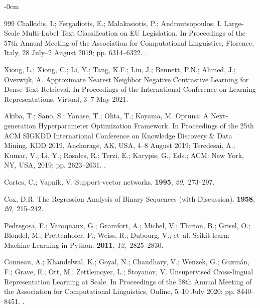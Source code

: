 \documentclass[make,article,accept,pdftex,moreauthors]{Definitions/mdpi}
\begin{document}
\begin{adjustwidth}{-\extralength}{0cm}
\begin{thebibliography}{999}
Chalkidis, I.; Fergadiotis, E.; Malakasiotis, P.; Androutsopoulos, I.
\newblock Large-Scale Multi-Label Text Classification on {EU} Legislation.
\newblock In Proceedings of the 57th Annual Meeting of the
  Association for Computational Linguistics, Florence, Italy, 28 July--2 August 2019; pp.
  6314--6322.
.

Xiong, L.; Xiong, C.; Li, Y.; Tang, K.F.; Liu, J.; Bennett, P.N.; Ahmed, J.;
  Overwijk, A.
\newblock Approximate Nearest Neighbor Negative Contrastive Learning for Dense
  Text Retrieval.
\newblock In Proceedings of the International Conference on Learning
  Representations, Virtual, 3--7 May 2021.

Akiba, T.; Sano, S.; Yanase, T.; Ohta, T.; Koyama, M.
\newblock Optuna: {A} Next-generation Hyperparameter Optimization Framework.
\newblock In Proceedings of the 25th {ACM} {SIGKDD}
  International Conference on Knowledge Discovery {\&} Data Mining, {KDD} 2019,
  Anchorage, AK, USA, 4--8 August 2019; Teredesai, A.; Kumar, V.; Li, Y.;
  Rosales, R.; Terzi, E.; Karypis, G., Eds.; {ACM}: New York, NY, USA, 2019; pp. 2623--2631.
.

Cortes, C.; Vapnik, V.
\newblock Support-vector networks.
 {\bf 1995}, {\em 20},~273--297.

Cox, D.R.
\newblock The Regression Analysis of Binary Sequences (with Discussion).
 {\bf 1958}, {\em 20},~215--242.

Pedregosa, F.; Varoquaux, G.; Gramfort, A.; Michel, V.; Thirion, B.; Grisel,
  O.; Blondel, M.; Prettenhofer, P.; Weiss, R.; Dubourg, V.;  et~al.
\newblock Scikit-learn: Machine Learning in {P}ython.
 {\bf 2011}, {\em
  12},~2825--2830.

Conneau, A.; Khandelwal, K.; Goyal, N.; Chaudhary, V.; Wenzek, G.; Guzm{\'a}n,
  F.; Grave, E.; Ott, M.; Zettlemoyer, L.; Stoyanov, V.
\newblock Unsupervised Cross-lingual Representation Learning at Scale.
\newblock In Proceedings of the 58th Annual Meeting of the
  Association for Computational Linguistics, Online, 5--10 July 2020; pp. 8440--8451.
.


\end{thebibliography}
\end{adjustwidth}
\end{document}
